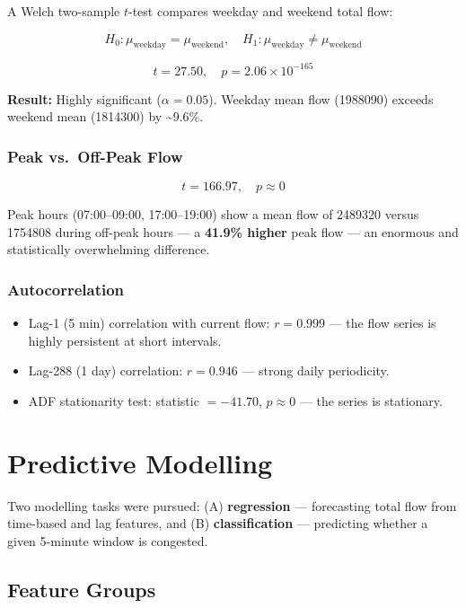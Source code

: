 \documentclass[12pt,a4paper]{article}
\begin{document}
A Welch two-sample $t$-test compares weekday and weekend total flow:

\[
H_0: \mu_{\text{weekday}} = \mu_{\text{weekend}}, \quad H_1: \mu_{\text{weekday}} \neq \mu_{\text{weekend}}
\]

\[
t = 27.50, \quad p = 2.06 \times 10^{-165}
\]

\textbf{Result:} Highly significant ($\alpha = 0.05$). Weekday mean flow (\num{1988090}) exceeds weekend mean (\num{1814300}) by \textasciitilde 9.6\%.

\subsubsection{Peak vs.\ Off-Peak Flow}

\[
t = 166.97, \quad p \approx 0
\]

Peak hours (07:00–09:00, 17:00–19:00) show a mean flow of \num{2489320} versus \num{1754808} during off-peak hours — a \textbf{41.9\% higher} peak flow — an enormous and statistically overwhelming difference.

\subsubsection{Autocorrelation}

\begin{itemize}
    \item Lag-1 (5 min) correlation with current flow: $r = 0.999$ — the flow series is highly persistent at short intervals.
    \item Lag-288 (1 day) correlation: $r = 0.946$ — strong daily periodicity.
    \item ADF stationarity test: statistic $= -41.70$, $p \approx 0$ — the series is stationary.
\end{itemize}

\section{Predictive Modelling}

Two modelling tasks were pursued: (A) \textbf{regression} — forecasting total flow from time-based and lag features, and (B) \textbf{classification} — predicting whether a given 5-minute window is congested.

\subsection{Feature Groups}
\end{document}

